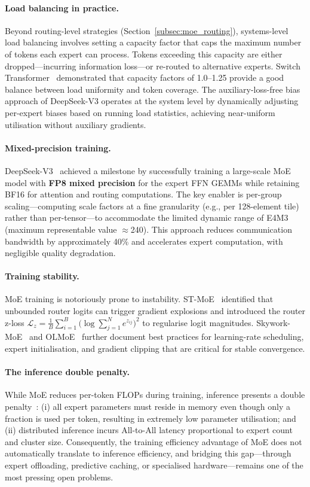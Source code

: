\paragraph{Load balancing in practice.}
Beyond routing-level strategies (Section~\ref{subsec:moe_routing}), systems-level load balancing involves setting a capacity factor that caps the maximum number of tokens each expert can process.
Tokens exceeding this capacity are either dropped---incurring information loss---or re-routed to alternative experts.
Switch Transformer~\cite{fedus2022switch} demonstrated that capacity factors of 1.0--1.25 provide a good balance between load uniformity and token coverage.
The auxiliary-loss-free bias approach of DeepSeek-V3 operates at the system level by dynamically adjusting per-expert biases based on running load statistics, achieving near-uniform utilisation without auxiliary gradients.

\paragraph{Mixed-precision training.}
DeepSeek-V3~\cite{liu2024deepseek} achieved a milestone by successfully training a large-scale MoE model with \textbf{FP8 mixed precision} for the expert FFN GEMMs while retaining BF16 for attention and routing computations.
The key enabler is per-group scaling---computing scale factors at a fine granularity (e.g., per 128-element tile) rather than per-tensor---to accommodate the limited dynamic range of E4M3 (maximum representable value $\approx$240).
This approach reduces communication bandwidth by approximately 40\% and accelerates expert computation, with negligible quality degradation.

\paragraph{Training stability.}
MoE training is notoriously prone to instability.
ST-MoE~\cite{zoph2022stmoe} identified that unbounded router logits can trigger gradient explosions and introduced the router z-loss $\mathcal{L}_z = \frac{1}{B}\sum_{i=1}^{B}\bigl(\log \sum_{j=1}^{N} e^{z_{ij}}\bigr)^2$ to regularise logit magnitudes.
Skywork-MoE~\cite{wei2024skywork} and OLMoE~\cite{muennighoff2024olmoe} further document best practices for learning-rate scheduling, expert initialisation, and gradient clipping that are critical for stable convergence.

\paragraph{The inference double penalty.}
While MoE reduces per-token FLOPs during training, inference presents a double penalty~\cite{moe_double_penalty_2026}: (i) all expert parameters must reside in memory even though only a fraction is used per token, resulting in extremely low parameter utilisation; and (ii) distributed inference incurs All-to-All latency proportional to expert count and cluster size.
Consequently, the training efficiency advantage of MoE does not automatically translate to inference efficiency, and bridging this gap---through expert offloading, predictive caching, or specialised hardware---remains one of the most pressing open problems.


